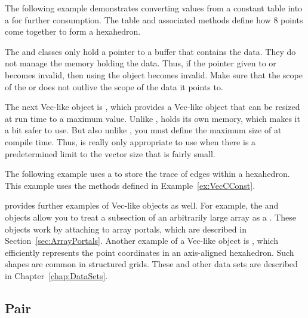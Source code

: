 The following example demonstrates converting values from a constant table into a  for further consumption.
The table and associated methods define how 8 points come together to form a hexahedron.


\begin{commonerrors}
  The  and  classes only hold a pointer to a buffer that contains the data.
  They do not manage the memory holding the data.
  Thus, if the pointer given to  or  becomes invalid, then using the object becomes invalid.
  Make sure that the scope of the  or  does not outlive the scope of the data it points to.
\end{commonerrors}

The next Vec-like object is , which provides a Vec-like object that can be resized at run time to a maximum value.
Unlike ,  holds its own memory, which makes it a bit safer to use.
But also unlike , you must define the maximum size of  at compile time.
Thus,  is really only appropriate to use when there is a predetermined limit to the vector size that is fairly small.

The following example uses a  to store the trace of edges within a hexahedron.
This example uses the methods defined in Example~\ref{ex:VecCConst}.


\VTKm provides further examples of Vec-like objects as well.
For example, the  and  objects allow you to treat a subsection of an arbitrarily large array as a .
These objects work by attaching to array portals, which are described in Section~\ref{sec:ArrayPortals}.
Another example of a Vec-like object is , which efficiently represents the point coordinates in an axis-aligned hexahedron.
Such shapes are common in structured grids.
These and other data sets are described in Chapter~\ref{chap:DataSets}.



\subsection{Pair}
\label{sec:Pair}

